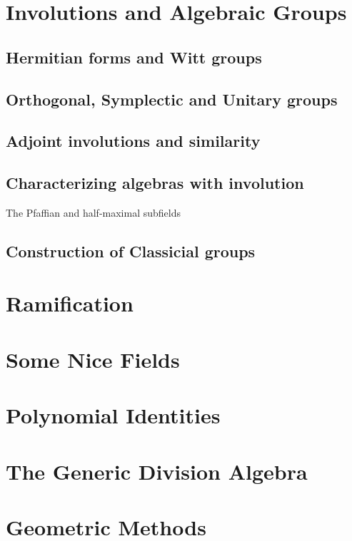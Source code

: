 \documentclass[12pt]{report}
\theoremstyle{plain}
\newcommand{\todo}[1]{\textcolor{todo}{#1}}
\begin{document}
\chapter{Involutions and Algebraic Groups}

\section{Hermitian forms and Witt groups}

\section{Orthogonal, Symplectic and Unitary groups}

\section{Adjoint involutions and similarity}

\section{Characterizing algebras with involution}

\todo{The Pfaffian and half-maximal subfields}

\section{Construction of Classicial groups}

\chapter{Ramification}

\chapter{Some Nice Fields}

\chapter{Polynomial Identities}

\chapter{The Generic Division Algebra}

\chapter{Geometric Methods}
\end{document}

